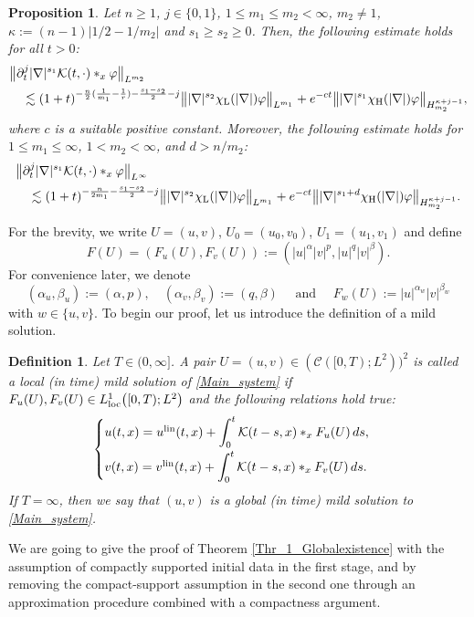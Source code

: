 \documentclass[11pt,reqno]{amsart}
\newtheorem{definition}{Definition}[section]
\newtheorem{proposition}{Proposition}[section]
\begin{document}
	\begin{proposition}\cite[Theorem 1.1]{IkedaInuiOkamoto2019}\label{LinearEstimates}
		Let $n\geq1$, $j\in\{0,1\}$, $1\leq m_1\leq m_2<\infty$, $m_2\neq1$,
		$\kappa:=(n-1)\left|1/2-1/m_2\right|$ and $s_1\geq s_2\geq0$.
		Then, the following estimate holds for all $t>0$:
		\begin{align*}
			&\big\|\partial_t^j |\nabla|^{s_1} \mathcal{K}(t,\cdot)\ast_x \varphi\big\|_{L^{m_2}}\\ &\quad\lesssim (1+t)^{-\frac{n}{2}(\frac{1}{m_1}-\frac{1}{r})-\frac{s_1-s_2}{2}-j} \big\||\nabla|^{s_2} \chi_{\rm L}(|\nabla|)\varphi\big\|_{L^{m_1}} + e^{-ct} \big\||\nabla|^{s_1}\chi_{\rm H}(|\nabla|) \varphi\big\|_{H_{m_2}^{\kappa+j-1}},
		\end{align*}
		where $c$ is a suitable positive constant.
		Moreover, the following estimate holds for $1\leq m_1\leq\infty$, $1<m_2<\infty$, and $d>n/m_2$:
		\begin{align*}
			&\big\|\partial_t^j |\nabla|^{s_1}\mathcal{K}(t,\cdot) \ast_x \varphi \big\|_{L^{\infty}}\\ &\quad\lesssim (1+t)^{-\frac{n}{2m_1}-\frac{s_1-s_2}{2}-j} \big\||\nabla|^{s_2} \chi_{\rm L}(|\nabla|) \varphi\big\|_{L^{m_1}} + e^{-ct}\big \||\nabla|^{s_1 + d} \chi_{\rm H}(|\nabla|) \varphi\big\|_{H^{\kappa+j -1}_{m_2}}.
		\end{align*}
	\end{proposition}
	For the brevity, we write $U=(u,v)$, $U_0=(u_0,v_0)$, $U_1=(u_1,v_1)$ and define
	\[
	F(U)=(F_u(U),F_v(U)):=(|u|^{\alpha}|v|^p,|u|^{q}|v|^{\beta}).
	\]  
	For convenience later, we denote
	\[
	(\alpha_u,\beta_u):=(\alpha,p),\quad
	(\alpha_v,\beta_v):=(q,\beta)\quad \text{ and }\quad F_w(U):=|u|^{\alpha_w}|v|^{\beta_w}
	\]
	with $w\in\{u,v\}$. To begin our proof, let us introduce the definition of a mild solution.
	\begin{definition}\label{MildSol.Def}
		Let $T\in(0,\infty]$. A pair $U=(u,v) \in(\mathcal{C}([0,T);L^2))^2$ is called a local (in time) mild solution of \eqref{Main_system} if $F_u(U),F_v(U)\in L_{\rm loc}^1\big([0,T);L^2\big)$ and the following relations hold true:
		\begin{equation}\label{duhamel_formula}
			\begin{cases}\vspace{0.1cm}
				u(t,x)=u^{\rm lin}(t,x)+\displaystyle\int_{0}^{t}\mathcal{K}(t-s,x)\ast_x F_u(U)\,ds, \\
				v(t,x)=v^{\rm lin}(t,x)+\displaystyle\int_{0}^{t}\mathcal{K}(t-s,x)\ast_x F_v(U)\,ds.
			\end{cases}
		\end{equation}
		If $T = \infty$, then we say that $(u,v)$ is a global (in time) mild solution to \eqref{Main_system}.
	\end{definition}
	We are going to give the proof of Theorem \ref{Thr_1_Globalexistence} with the assumption of compactly supported initial data in the first stage, and by removing the compact-support assumption in the second one through an approximation procedure combined with a compactness argument.
	
\end{document}
